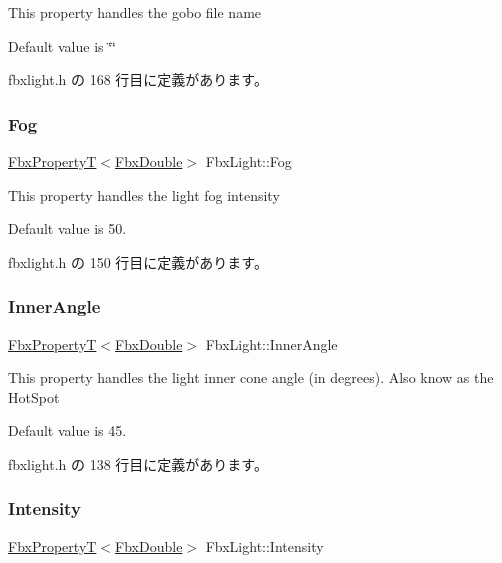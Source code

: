 This property handles the gobo file name

Default value is \char`\"{}\char`\"{} 

 fbxlight.\+h の 168 行目に定義があります。

\mbox{\label{class_fbx_light_a85b9565571e88a5899fa7683ff77643c}} 
\subsubsection{\texorpdfstring{Fog}{Fog}}
{\footnotesize\ttfamily \hyperlink{class_fbx_property_t}{Fbx\+PropertyT}$<$\hyperlink{fbxtypes_8h_a171e72a1c46fc15c1a6c9c31948c1c5b}{Fbx\+Double}$>$ Fbx\+Light\+::\+Fog}

This property handles the light fog intensity

Default value is 50. 

 fbxlight.\+h の 150 行目に定義があります。

\mbox{\label{class_fbx_light_aced336586b1b3a1b8d685bf11ef21216}} 
\subsubsection{\texorpdfstring{Inner\+Angle}{InnerAngle}}
{\footnotesize\ttfamily \hyperlink{class_fbx_property_t}{Fbx\+PropertyT}$<$\hyperlink{fbxtypes_8h_a171e72a1c46fc15c1a6c9c31948c1c5b}{Fbx\+Double}$>$ Fbx\+Light\+::\+Inner\+Angle}

This property handles the light inner cone angle (in degrees). Also know as the Hot\+Spot

Default value is 45. 

 fbxlight.\+h の 138 行目に定義があります。

\mbox{\label{class_fbx_light_a3fc7a2684e3ab3cbd944825afd263433}} 
\subsubsection{\texorpdfstring{Intensity}{Intensity}}
{\footnotesize\ttfamily \hyperlink{class_fbx_property_t}{Fbx\+PropertyT}$<$\hyperlink{fbxtypes_8h_a171e72a1c46fc15c1a6c9c31948c1c5b}{Fbx\+Double}$>$ Fbx\+Light\+::\+Intensity}

